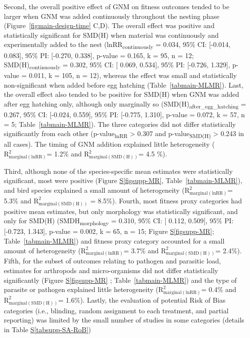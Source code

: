 \documentclass[
  number,
  review,
  onecolumn]{elsarticle}
\newcommand*\quartofigsuppref[1]{Figure \hyperref[#1]{S\ref{#1}}}
\newcommand*\quartotabsuppref[1]{Table \hyperref[#1]{S\ref{#1}}}
\begin{document}
Second, the overall positive effect of GNM on fitness outcomes tended to
be larger when GNM was added continuously throughout the nesting phase
(Figure~\ref{figmain-design-time} C,D). The overall effect was positive
and statistically significant for SMD(H) when material was continuously
and experimentally added to the nest (lnRR\textsubscript{continuously} =
0.034, 95\% CI: {[}-0.014, 0.083{]}, 95\% PI: {[}-0.270, 0.338{]},
p-value = 0.165, k = 95, n = 12; SMD(H)\textsubscript{continuously} =
0.302, 95\% CI: {[} 0.069, 0.534{]}, 95\% PI: {[}-0.726, 1.329{]},
p-value = 0.011, k = 105, n = 12), whereas the effect was small and
statistically non-significant when added before egg hatching
(Table~\ref{tabmain-MLMR}). Last, the overall effect also tended to be
positive for SMD(H) when GNM was added after egg hatching only, although
only marginally so (SMD(H)\textsubscript{after\_egg\_hatching} = 0.267,
95\% CI: {[}-0.024, 0.559{]}, 95\% PI: {[}-0.775, 1.310{]}, p-value =
0.072, k = 57, n = 5; Table~\ref{tabmain-MLMR}). The three categories
did not differ statistically significantly from each other
(p-value\textsubscript{lnRR} \textgreater{} 0.307 and
p-value\textsubscript{SMD(H)} \textgreater{} 0.243 in all cases). The
timing of GNM addition explained little heterogeneity
(\(\mathrm{R}^2_{\mathrm{marginal}(\mathrm{lnRR})}\)= 1.2\% and
\(\mathrm{R}^2_{\mathrm{marginal}(\mathrm{SMD(H)})}\)= 4.5 \%).

Third, although none of the species-specific mean estimates were
statistically significant, most were positive
(\quartofigsuppref{figsupp-MR}, Table~\ref{tabmain-MLMR}), and bird
species explained a small amount of heterogeneity
(\(\mathrm{R}^2_{\mathrm{marginal}(\mathrm{lnRR})}\)= 5.3\% and
\(\mathrm{R}^2_{\mathrm{marginal}(\mathrm{SMD(H)})}\) = 8.5\%). Fourth,
most fitness proxy categories had positive mean estimates, but only
morphology was statistically significant, and only for SMD(H)
(SMDH\textsubscript{morphology} = 0.310, 95\% CI: {[} 0.112, 0.509{]},
95\% PI: {[}-0.723, 1.343{]}, p-value = 0.002, k = 65, n = 15;
\quartofigsuppref{figsupp-MR}; Table~\ref{tabmain-MLMR}) and fitness
proxy category accounted for a small amount of heterogeneity
(\(\mathrm{R}^2_{\mathrm{marginal}(\mathrm{lnRR})}\)= 3.7\% and
\(\mathrm{R}^2_{\mathrm{marginal}(\mathrm{SMD(H)})}\)= 2.4\%). Fifth,
for the subset of outcomes relating to pathogen and parasitic load,
estimates for arthropods and micro-organisms did not differ
statistically significantly (\quartofigsuppref{figsupp-MR} ;
Table~\ref{tabmain-MLMR}) and the type of parasite or pathogen explained
little heterogeneity
(\(\mathrm{R}^2_{\mathrm{marginal}(\mathrm{lnRR})}\)= 0.4\% and
\(\mathrm{R}^2_{\mathrm{marginal}(\mathrm{SMD(H)})}\)= 1.6\%). Lastly,
the evaluation of potential Risk of Bias categories (i.e., blinding,
random assignment to each treatment, and partial reporting) was limited
by the small number of studies in some categories (details in
\quartotabsuppref{tabsupp-SA-RoB})
\end{document}
